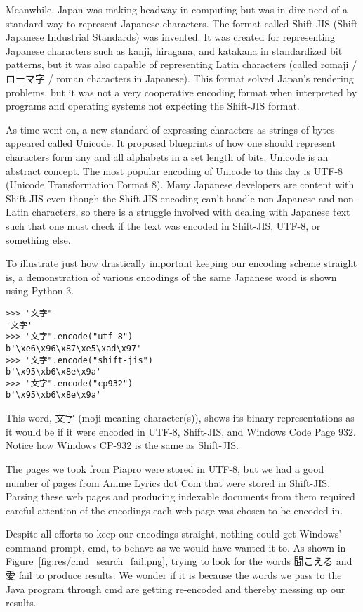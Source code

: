 \documentclass{acm} %
\begin{document}
\begin{CJK}{UTF8}{zhsong}
Meanwhile, Japan was making headway in computing but was in dire need of a standard way to represent Japanese characters. The format called Shift-JIS (Shift Japanese Industrial Standards) was invented. It was created for representing Japanese characters such as kanji, hiragana, and katakana in standardized bit patterns, but it was also capable of representing Latin characters (called romaji / ローマ字 / roman characters in Japanese). This format solved Japan's rendering problems, but it was not a very cooperative encoding format when interpreted by programs and operating systems not expecting the Shift-JIS format.

As time went on, a new standard of expressing characters as strings of bytes appeared called Unicode. It proposed blueprints of how one should represent characters form any and all alphabets in a set length of bits. Unicode is an abstract concept. The most popular encoding of Unicode to this day is UTF-8 (Unicode Transformation Format 8). Many Japanese developers are content with Shift-JIS even though the Shift-JIS encoding can't handle non-Japanese and non-Latin characters, so there is a struggle involved with dealing with Japanese text such that one must check if the text was encoded in Shift-JIS, UTF-8, or something else.

To illustrate just how drastically important keeping our encoding scheme straight is, a demonstration of various encodings of the same Japanese word is shown using Python 3.

\begin{verbatim}
>>> "文字"
'文字'
>>> "文字".encode("utf-8")
b'\xe6\x96\x87\xe5\xad\x97'
>>> "文字".encode("shift-jis")
b'\x95\xb6\x8e\x9a'
>>> "文字".encode("cp932")
b'\x95\xb6\x8e\x9a'
\end{verbatim}

This word, 文字 (moji meaning character(s)), shows its binary representations as it would be if it were encoded in UTF-8, Shift-JIS, and Windows Code Page 932. Notice how Windows CP-932 is the same as Shift-JIS.

The pages we took from Piapro were stored in UTF-8, but we had a good number of pages from Anime Lyrics dot Com that were stored in Shift-JIS. Parsing these web pages and producing indexable documents from them required careful attention of the encodings each web page was chosen to be encoded in.

Despite all efforts to keep our encodings straight, nothing could get Windows' command prompt, cmd, to behave as we would have wanted it to. As shown in Figure~\ref{fig:res/cmd_search_fail.png}, trying to look for the words 聞こえる and 愛 fail to produce results. We wonder if it is because the words we pass to the Java program through cmd are getting re-encoded and thereby messing up our results.


\end{CJK}
\end{document}
